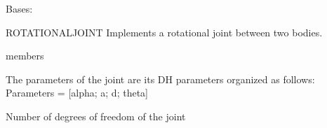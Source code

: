 \documentclass[letterpaper,10pt,english]{sphinxmanual}
\begin{document}
\begin{fulllineitems}
\label{\detokenize{rotationaljoint:RotationalJoint}}
\pysigstartsignatures
{}
\pysigstopsignatures
\sphinxAtStartPar
Bases: {\hyperref[\detokenize{joint:Joint}]{}}

\sphinxAtStartPar
ROTATIONALJOINT Implements a rotational joint between two bodies.

\begin{sphinxuseclass}{members}\begin{description}

\begin{fulllineitems}
\label{\detokenize{rotationaljoint:RotationalJoint.Parameters}}
\pysigstartsignatures
{}
\pysigstopsignatures
\sphinxAtStartPar
The parameters of the joint are its DH parameters organized as
follows: Parameters = {[}alpha; a; d; theta{]}

\end{fulllineitems}


\begin{fulllineitems}
\label{\detokenize{rotationaljoint:RotationalJoint.n}}
\pysigstartsignatures
{}
\pysigstopsignatures
\sphinxAtStartPar
Number of degrees of freedom of the joint

\end{fulllineitems}


\end{description}

\end{sphinxuseclass}
\end{fulllineitems}



\renewcommand{\indexname}{MATLAB Module Index}
\begin{sphinxtheindex}
\let\bigletter\sphinxstyleindexlettergroup
\bigletter{c}
\item\relax{}
\end{sphinxtheindex}

\renewcommand{\indexname}{Index}
\printindex
\end{document}
